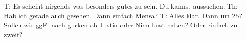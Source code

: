 T: Es scheint nirgends was besonders gutes zu sein. Du kannst aussuchen.
Th: Hab ich gerade auch gesehen. Dann einfach Mensa? 
T: Alles klar. Dann um 25? Sollen wir ggF. noch gucken ob Justin oder Nico Lust haben? Oder einfach zu zweit?
